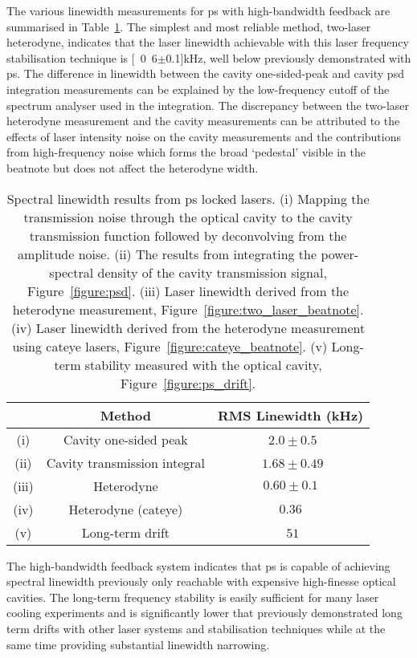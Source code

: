 The various linewidth measurements for \gls{ps} with high-bandwidth feedback are summarised in Table~\ref{table:linewidths}.
The simplest and most reliable method, two-laser heterodyne, indicates that the laser linewidth achievable with this laser frequency stabilisation technique is \unit[0.6$\pm$0.1]{kHz}, well below previously demonstrated with \gls{ps}.
The difference in linewidth between the cavity one-sided-peak and cavity \gls{psd} integration measurements can be explained by the low-frequency cutoff of the spectrum analyser used in the integration.
The discrepancy between the two-laser heterodyne measurement and the cavity measurements can be attributed to the effects of laser intensity noise on the cavity measurements and the contributions from high-frequency noise which forms the broad `pedestal' visible in the beatnote but does not affect the heterodyne width.

\begin{table}
\centering
\begin{tabular}{c c c}
\\
\hline
        & Method                       & RMS Linewidth (kHz) \\ \hline
  (i)   & Cavity one-sided peak        & \,\,$2.0 \pm 0.5$   \\
  (ii)  & Cavity transmission integral & \,\,$1.68 \pm 0.49$ \\
  (iii) & Heterodyne                   & $0.60\pm0.1$        \\
  (iv)  & Heterodyne (cateye)          & $0.36$              \\
  (v)   & Long-term drift              & \,\,$51$            \\ \hline\end{tabular}

\caption{Spectral linewidth results from \gls{ps} locked lasers.
(i) Mapping the transmission noise through the optical cavity to the cavity transmission function followed by deconvolving from the amplitude noise.
(ii) The results from integrating the power-spectral density of the cavity transmission signal, Figure~\ref{figure:psd}.
(iii) Laser linewidth derived from the heterodyne measurement, Figure~\ref{figure:two_laser_beatnote}.
(iv) Laser linewidth derived from the heterodyne measurement using cateye lasers, Figure~\ref{figure:cateye_beatnote}.
(v) Long-term stability measured with the optical cavity, Figure~\ref{figure:ps_drift}.}
\label{table:linewidths}
\end{table}

The high-bandwidth feedback system indicates that \gls{ps} is capable of achieving spectral linewidth previously only reachable with expensive high-finesse optical cavities.
The long-term frequency stability is easily sufficient for many laser cooling experiments and is significantly lower that previously demonstrated long term drifts with other laser systems and stabilisation techniques while at the same time providing substantial linewidth narrowing.

